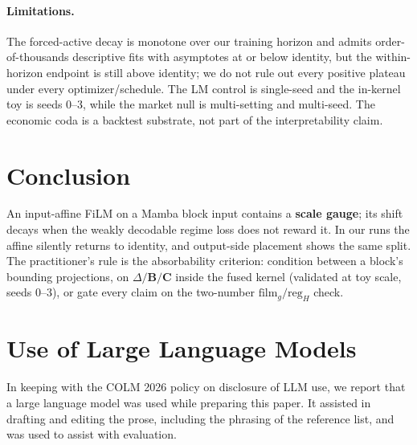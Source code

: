 \documentclass{article}
\begin{document}
\paragraph{Limitations.}
The forced-active decay is monotone over our training horizon and admits
order-of-thousands descriptive fits with asymptotes at or below identity, but the
within-horizon endpoint is still above identity; we do not rule out every positive
plateau under every optimizer/schedule. The LM control is single-seed and the
in-kernel toy is seeds 0--3, while the market null is multi-setting and multi-seed.
The economic coda is a backtest substrate, not part of the interpretability claim.

\section{Conclusion}\label{sec:conclusion}

An input-affine FiLM on a Mamba block input contains a \textbf{scale gauge}; its
shift decays when the weakly decodable regime loss does not reward it. In our runs
the affine silently returns to identity, and output-side placement shows the same
split. The practitioner's rule is the absorbability criterion: condition between a
block's bounding projections, on $\Delta/\mathbf{B}/\mathbf{C}$ inside the fused
kernel (validated at toy scale, seeds 0--3), or gate every claim on the two-number
$\mathrm{film}_g/\mathrm{reg}_H$ check.

\section*{Use of Large Language Models}
In keeping with the COLM 2026 policy on disclosure of LLM use, we report that a large language model was used while preparing this paper. It assisted in drafting and editing the prose, including the phrasing of the reference list, and was used to assist with evaluation.
\end{document}

